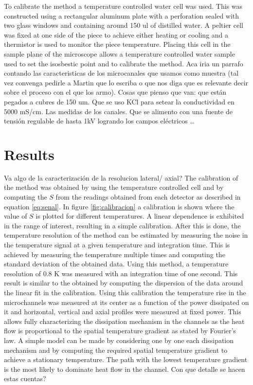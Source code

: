 \documentclass[twocolumn]{svjour3}       %
\begin{document}
To calibrate the method a temperature controlled water cell was used. This was constructed using a rectangular aluminum plate with a perforation sealed with two glass windows and containing around 150 ul of distilled water. A peltier cell was fixed at one side of the piece to achieve either heating or cooling and a thermistor is used to monitor the piece temperature.  Placing this cell in the sample plane of the microscope allows a temperature controlled water sample used to set the isosbestic point and to calibrate the method. 
Aca iria un parrafo contando las caracteristicas de los microcanales que usamos como muestra (tal vez convenga pedirle a Martin que lo escriba o que nos diga que es relevante decir sobre el proceso con el que los armo). Cosas que pienso que van: que están pegados a cubres de 150 um. Que se uso KCl para setear la conductividad en 5000 mS/cm. Las medidas de los canales. Que se alimento con una fuente de tensión regulable de hasta 1kV logrando los campos eléctricos …

\section{Results}
Va algo de la caracterización de la resolucion lateral/ axial?
The calibration of the method was obtained by using the temperature controlled cell and by computing the $S$ from the readings obtained from each detector as described in equation \ref{eq:senal}. In figure \ref{fig:calibracion} a calibration is shown where the value of $S$ is plotted for different temperatures. A linear dependence is exhibited in the range of interest, resulting in a simple calibration. After this is done, the temperature resolution of the method can be estimated by measuring the noise in the temperature signal at a given temperature and integration time. This is achieved by measuring the temperature multiple times and computing the standard deviation of the obtained data. Using this method, a temperature resolution of 0.8 K was measured with an integration time of one second. This result is similar to the obtained by computing the dispersion of the data around the linear fit in the calibration.
Using this calibration the temperature rise in the microchannels was measured at its center as a function of the power dissipated on it and horizontal, vertical and axial profiles were measured at fixed power. This allows fully characterizing the dissipation mechanism in the channels as the heat flow is proportional to the spatial temperature gradient as stated by Fourier’s law. A simple model can be made by considering one by one each dissipation mechanism and by computing the required spatial temperature gradient to achieve a stationary temperature. The path with the lowest temperature gradient is the most likely to dominate heat flow in the channel. Con que detalle se hacen estas cuentas?
 
\end{document}
